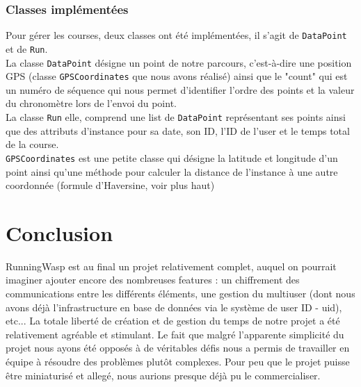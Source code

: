 \documentclass[a4paper,11pt]{article}
\begin{document}
\subsubsection{Classes implémentées}
Pour gérer les courses, deux classes ont été implémentées, il s'agit de \verb+DataPoint+ et de \verb+Run+. \\

La classe \verb+DataPoint+ désigne un point de notre parcours, c'est-à-dire une position GPS (classe \verb+GPSCoordinates+ que nous avons réalisé) ainsi que le "count" qui est un numéro de séquence qui nous permet d'identifier l'ordre des points et la valeur du chronomètre lors de l'envoi du point. \\

La classe \verb+Run+ elle, comprend une list de \verb+DataPoint+ représentant ses points ainsi que des attributs d'instance pour sa date, son ID, l'ID de l'user et le temps total de la course. \\

\verb+GPSCoordinates+ est une petite classe qui désigne la latitude et longitude d'un point ainsi qu'une méthode pour calculer la distance de l'instance à une autre coordonnée (formule d'Haversine, voir plus haut)


\section{Conclusion}
RunningWasp est au final un projet relativement complet, auquel on pourrait imaginer ajouter encore des nombreuses features : un chiffrement des communications entre les différents éléments, une gestion du multiuser (dont nous avons déjà l'infrastructure en base de données via le système de user ID - uid), etc... 
\newline La totale liberté de création et de gestion du temps de notre projet a été relativement agréable et stimulant. Le fait que malgré l'apparente simplicité du projet nous ayons été opposés à de véritables défis nous a permis de travailler en équipe à résoudre des problèmes plutôt complexes. 
\newline Pour peu que le projet puisse être miniaturisé et allegé, nous aurions presque déjà pu le commercialiser.
\end{document}
